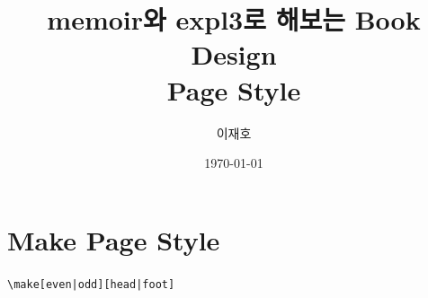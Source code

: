 \documentclass{beamer}
\title{%
  {\large memoir와 expl3로 해보는 Book Design}\\
  Page Style
}
\author{이재호}
\institute{memoir 스터디 그룹}
\date{\today}
\begin{document}
\maketitle

\section{Make Page Style}

\begin{frame}[fragile]{\texttt{\textbackslash make[even|odd][head|foot]}}
  \begin{columns}
    \begin{column}{0.6\textwidth}
      \begin{latexcode}
      \end{latexcode}
    \end{column}


\end{columns}
\end{frame}
\end{document}
